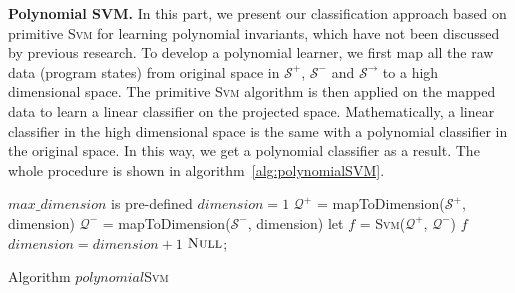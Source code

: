 \medskip\noindent
\textbf{Polynomial SVM.}
In this part, we present our classification approach based on primitive \textsc{Svm} for learning polynomial invariants,
which have not been discussed by previous research.
To develop a polynomial learner, 
we first map all the raw data (program states) from original space in $\mathcal{S}^+$, $\mathcal{S}^-$ and $\mathcal{S}^\rightarrow$ 
to a high dimensional space.
The primitive \textsc{Svm} algorithm is then applied on the mapped data to learn a linear classifier on the projected space.%
Mathematically, a linear classifier in the high dimensional space is the same with a polynomial classifier in the original space.
In this way, we get a polynomial classifier as a result.
The whole procedure is shown in algorithm~\ref{alg:polynomialSVM}.

\begin{algorithm}[!h]
\SetAlgoVlined
\Indm
{}
\Indp
    $max\_dimension$ is pre-defined\;
    $dimension = 1$\;
     {
        $\mathcal{Q}^+$ = mapToDimension($\mathcal{S}^+$, dimension)\;
        $\mathcal{Q}^-$ = mapToDimension($\mathcal{S}^-$, dimension)\;
        let $f$ = \textsc{Svm}($\mathcal{Q}^+$, $\mathcal{Q}^-$)\;
         {
        	\Return $f$\;
    	}
    	$dimension = dimension + 1$\;
    }
    \Return $\textsc{Null}$;
\caption{Algorithm $polynomial$\textsc{Svm}}
\label{alg:polynomialSVM}
\end{algorithm}

